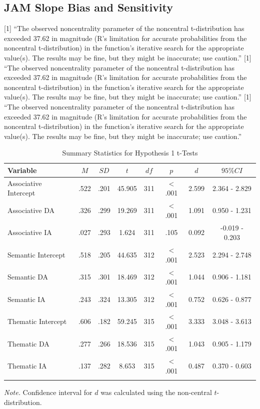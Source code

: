 \documentclass[english,,man]{apa6}
\begin{document}
\hypertarget{jam-slope-bias-and-sensitivity}{%
\subsection{JAM Slope Bias and Sensitivity}\label{jam-slope-bias-and-sensitivity}}

{[}1{]} \enquote{The observed noncentrality parameter of the noncentral t-distribution has exceeded 37.62 in magnitude (R's limitation for accurate probabilities from the noncentral t-distribution) in the function's iterative search for the appropriate value(s). The results may be fine, but they might be inaccurate; use caution.}
{[}1{]} \enquote{The observed noncentrality parameter of the noncentral t-distribution has exceeded 37.62 in magnitude (R's limitation for accurate probabilities from the noncentral t-distribution) in the function's iterative search for the appropriate value(s). The results may be fine, but they might be inaccurate; use caution.}
{[}1{]} \enquote{The observed noncentrality parameter of the noncentral t-distribution has exceeded 37.62 in magnitude (R's limitation for accurate probabilities from the noncentral t-distribution) in the function's iterative search for the appropriate value(s). The results may be fine, but they might be inaccurate; use caution.}

\begin{table}[tbp]
\begin{center}
\begin{threeparttable}
\caption{\label{tab:hyp1-table1}Summary Statistics for Hypothesis 1 t-Tests}
\begin{tabular}{lccccccc}
\toprule
Variable & $M$ & $SD$ & $t$ & $df$ & $p$ & $d$ & $95\% CI$\\
\midrule
Associative Intercept & .522 & .201 & 45.905 & 311 & < .001 & 2.599 & 2.364 - 2.829\\
Associative DA & .326 & .299 & 19.269 & 311 & < .001 & 1.091 & 0.950 - 1.231\\
Associative IA & .027 & .293 & 1.624 & 311 & .105 & 0.092 & -0.019 - 0.203\\
Semantic Intercept & .518 & .205 & 44.635 & 312 & < .001 & 2.523 & 2.294 - 2.748\\
Semantic DA & .315 & .301 & 18.469 & 312 & < .001 & 1.044 & 0.906 - 1.181\\
Semantic IA & .243 & .324 & 13.305 & 312 & < .001 & 0.752 & 0.626 - 0.877\\
Thematic Intercept & .606 & .182 & 59.245 & 315 & < .001 & 3.333 & 3.048 - 3.613\\
Thematic DA & .277 & .266 & 18.536 & 315 & < .001 & 1.043 & 0.905 - 1.179\\
Thematic IA & .137 & .282 & 8.653 & 315 & < .001 & 0.487 & 0.370 - 0.603\\
\bottomrule
\addlinespace
\end{tabular}
\begin{tablenotes}[para]
\normalsize{\textit{Note.} Confidence interval for $d$ was calculated using the non-central $t$-distribution. }
\end{tablenotes}
\end{threeparttable}
\end{center}
\end{table}
\end{document}
